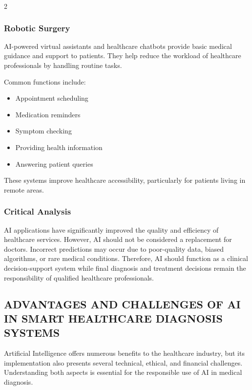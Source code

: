 \begin{multicols}{2}
  \subsubsection*{Robotic Surgery}
  AI-powered virtual assistants and healthcare chatbots provide basic medical guidance and support to patients. They help reduce the workload of healthcare professionals by handling routine tasks.

  \noindent
  Common functions include:
  \begin{itemize}
    \item Appointment scheduling
    \item Medication reminders
    \item Symptom checking
    \item Providing health information
    \item Answering patient queries
  \end{itemize}
  These systems improve healthcare accessibility, particularly for patients living in remote areas.

  \subsubsection*{Critical Analysis}
  AI applications have significantly improved the quality and efficiency of healthcare services. However, AI should not be considered a replacement for doctors. Incorrect predictions may occur due to poor-quality data, biased algorithms, or rare medical conditions. Therefore, AI should function as a clinical decision-support system while final diagnosis and treatment decisions remain the responsibility of qualified healthcare professionals.

  \subsection*{\centering\uppercase{Advantages and Challenges of AI in Smart Healthcare Diagnosis Systems}}
  Artificial Intelligence offers numerous benefits to the healthcare industry, but its implementation also presents several technical, ethical, and financial challenges. Understanding both aspects is essential for the responsible use of AI in medical diagnosis.


\end{multicols}
